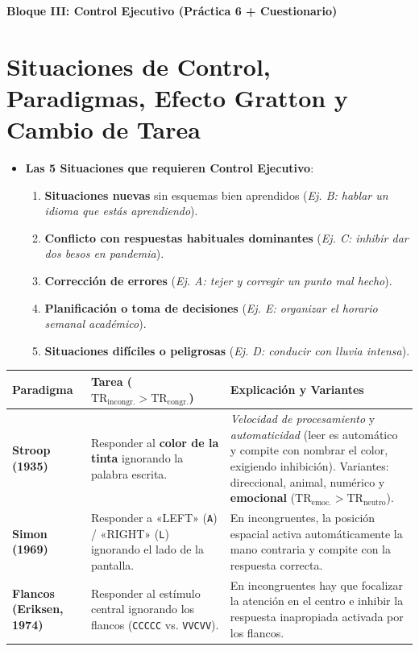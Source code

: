 \documentclass[11pt,a4paper]{article}
\newcommand{\bloque}[1]{%
  \vspace{0.6em}
  \begin{tcolorbox}[colback=Primary,colframe=Primary,arc=3pt,left=12pt,right=12pt,top=8pt,bottom=8pt,boxrule=0pt,after skip=8pt]
    {\Large\bfseries\color{white} #1}
  \end{tcolorbox}
}
\begin{document}
\newpage
\bloque{Bloque III: Control Ejecutivo (Práctica 6 + Cuestionario)}
\setcounter{section}{0}

\section{Situaciones de Control, Paradigmas, Efecto Gratton y Cambio de Tarea}

\begin{itemize}
  \item \textbf{Las 5 Situaciones que requieren Control Ejecutivo}:
  \begin{enumerate}
    \item \textbf{Situaciones nuevas} sin esquemas bien aprendidos (\textit{Ej. B: hablar un idioma que estás aprendiendo}).
    \item \textbf{Conflicto con respuestas habituales dominantes} (\textit{Ej. C: inhibir dar dos besos en pandemia}).
    \item \textbf{Corrección de errores} (\textit{Ej. A: tejer y corregir un punto mal hecho}).
    \item \textbf{Planificación o toma de decisiones} (\textit{Ej. E: organizar el horario semanal académico}).
    \item \textbf{Situaciones difíciles o peligrosas} (\textit{Ej. D: conducir con lluvia intensa}).
  \end{enumerate}
\end{itemize}

\vspace{0.3em}
\begin{center}
\renewcommand{\arraystretch}{1.35}
\begin{tabularx}{\textwidth}{@{}>{\raggedright\arraybackslash}p{3.0cm}>{\raggedright\arraybackslash}p{4.6cm}>{\raggedright\arraybackslash}X@{}}
\toprule
\rowcolor{Primary!15}
\textbf{Paradigma} & \textbf{Tarea ($\text{TR}_{\text{incongr.}} > \text{TR}_{\text{congr.}}$)} & \textbf{Explicación y Variantes} \\
\midrule
\textbf{Stroop (1935)} & Responder al \textbf{color de la tinta} ignorando la palabra escrita. & \textit{Velocidad de procesamiento} y \textit{automaticidad} (leer es automático y compite con nombrar el color, exigiendo inhibición). Variantes: direccional, animal, numérico y \textbf{emocional} ($\text{TR}_{\text{emoc.}} > \text{TR}_{\text{neutro}}$). \\
\textbf{Simon (1969)} & Responder a «LEFT» (\texttt{A}) / «RIGHT» (\texttt{L}) ignorando el lado de la pantalla. & En incongruentes, la posición espacial activa automáticamente la mano contraria y compite con la respuesta correcta. \\
\textbf{Flancos (Eriksen, 1974)} & Responder al estímulo central ignorando los flancos (\texttt{CCCCC} vs. \texttt{VVCVV}). & En incongruentes hay que focalizar la atención en el centro e inhibir la respuesta inapropiada activada por los flancos. \\
\bottomrule
\end{tabularx}
\end{center}
\vspace{0.3em}
\end{document}
